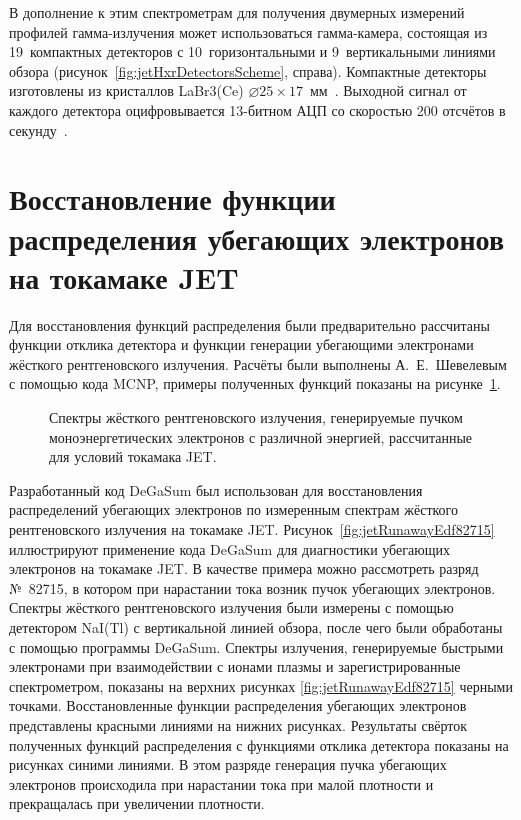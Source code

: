 В дополнение к этим спектрометрам для получения двумерных измерений профилей гамма-излучения может использоваться гамма-камера, состоящая из 19~компактных детекторов с 10~горизонтальными и 9~вертикальными линиями обзора (рисунок~\ref{fig:jetHxrDetectorsScheme}, справа). Компактные детекторы изготовлены из кристаллов LaBr3(Ce) $\varnothing 25 \times 17$~мм~\cite{Rigamonti2018}. Выходной сигнал от каждого детектора оцифровывается 13-битном АЦП со скоростью 200 отсчётов в секунду~\cite{Fernandes2018}.


\section{Восстановление функции распределения убегающих электронов на токамаке JET}

Для восстановления функций распределения были предварительно рассчитаны функции отклика детектора и функции генерации убегающими электронами жёсткого рентгеновского излучения. Расчёты были выполнены А.~Е.~Шевелевым с помощью кода MCNP, примеры полученных функций показаны на рисунке~\ref{fig:jetGenerationFunctions}. 

\begin{figure}[ht!]
  \caption{ Спектры жёсткого рентгеновского излучения, генерируемые пучком моноэнергетических электронов с различной энергией, рассчитанные для условий токамака JET.~\cite{Shevelev2013} }
  \label{fig:jetGenerationFunctions}
\end{figure}


Разработанный код DeGaSum был использован для восстановления распределений убегающих электронов по измеренным спектрам жёсткого рентгеновского излучения на токамаке JET. Рисунок~\ref{fig:jetRunawayEdf82715} иллюстрируют применение кода DeGaSum для диагностики убегающих электронов на токамаке JET. В качестве примера можно рассмотреть разряд №~82715, в котором при нарастании тока возник пучок убегающих электронов. Спектры жёсткого рентгеновского излучения были измерены с помощью   детектором NaI(Tl) с вертикальной линией обзора, после чего были обработаны с помощью программы DeGaSum. Спектры излучения, генерируемые быстрыми электронами при взаимодействии с ионами плазмы и зарегистрированные спектрометром, показаны на верхних рисунках \ref{fig:jetRunawayEdf82715} черными точками. Восстановленные функции распределения убегающих электронов представлены красными линиями на нижних рисунках. Результаты свёрток полученных функций распределения с функциями отклика детектора показаны на рисунках синими линиями. В этом разряде генерация пучка убегающих электронов происходила при нарастании тока при малой плотности и прекращалась при увеличении плотности.~\cite{Shevelev2013} 

